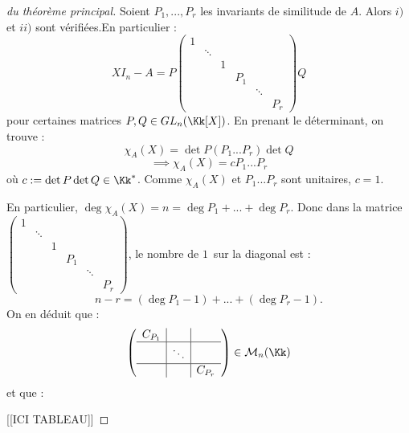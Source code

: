 \documentclass[class=report,crop=false]{standalone}
\newcommand{\GL}{GL}
\begin{document}
\begin{proof}[du théorème principal]
Soient $P_1,...,P_r$ les invariants de similitude de $A$. Alors $i)$ et $ii)$ sont vérifiées.En particulier :
\[XI_n-A = P\left(\begin{array}{cccccc}
1 &&&&&\\
& \ddots&&&&\\
&&1&&&\\
&&&P_1&&\\
&&&&\ddots&\\
&&&&&P_r
\end{array}
\right)Q \]
pour certaines matrices $P,Q \in \GL_n(\Kk[X])$. En prenant le déterminant, on trouve :
\[\chi_A(X) = \det P (P_1...P_r) \det Q\]
\[\implies \chi_A(X) = cP_1...P_r\]
où $c :=\det P \det Q \in \Kk^*$. Comme $\chi_A(X)$ et $P_1...P_r$ sont unitaires, $c=1$.

En particulier, $\deg\chi_A(X) = n = \deg P_1+...+\deg P_r$. Donc
 dans la matrice $\left(\begin{array}{cccccc}
1 &&&&&\\
& \ddots&&&&\\
&&1&&&\\
&&&P_1&&\\
&&&&\ddots&\\
&&&&&P_r
\end{array}
\right)$, le nombre de \og$1$\fg\ sur la diagonal est :
\[n-r = (\deg P_1-1) +...+(\deg P_r-1).\]
On en déduit que :
\[\left(\begin{array}{c|c|c}
C_{P_1}&&\\\hline
&\ddots&\\\hline
&&C_{P_r}
\end{array}\right) \in \mathcal{M}_n(\Kk)\]
et que :

[[ICI TABLEAU]]



\end{proof}
\end{document}
